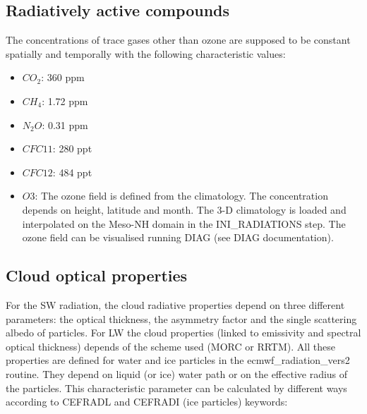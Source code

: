 \subsection{Radiatively active compounds}

The concentrations of trace gases other than ozone are supposed to be constant spatially and temporally with the following characteristic values: 
\begin{itemize}
\item  $CO_{2}$: 360 ppm
\item  $CH_{4}$: 1.72 ppm
\item  $N_{2}O$: 0.31 ppm
\item  $CFC11$: 280 ppt
\item  $CFC12$: 484 ppt
\item  $O{3}$: The ozone field is defined from the \citet{Fortuin1994} climatology. The concentration depends on height, latitude and month. The 3-D climatology is loaded and interpolated on the Meso-NH domain in the INI\_RADIATIONS step. The ozone field can be visualised running DIAG (see DIAG documentation). 
\end{itemize}



\subsection{Cloud optical properties}\label{subsecoptical}
For the SW radiation, the cloud radiative properties depend on three different parameters: the optical thickness, the asymmetry factor and the single scattering albedo of particles. For LW the cloud properties (linked to emissivity and spectral optical thickness) depends of the scheme used (MORC or RRTM). All these properties are defined for water and ice particles in the ecmwf\_radiation\_vers2 routine. They depend on liquid (or ice) water path or on the effective radius of the particles. This characteristic parameter can be calculated by different ways according to CEFRADL and CEFRADI (ice particles) keywords:\\

